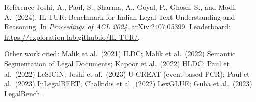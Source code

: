 \documentclass[aspectratio=169,11pt]{beamer}
\begin{document}
\begin{frame}{Reference}
  \small
  Joshi, A., Paul, S., Sharma, A., Goyal, P., Ghosh, S., and Modi, A.\ (2024). IL-TUR: Benchmark for Indian Legal Text Understanding and Reasoning. In \emph{Proceedings of ACL 2024}. arXiv:2407.05399. Leaderboard: \url{https://exploration-lab.github.io/IL-TUR/}.
  \vspace{3mm}

  {\footnotesize Other work cited: Malik et al.\ (2021) ILDC; Malik et al.\ (2022) Semantic Segmentation of Legal Documents; Kapoor et al.\ (2022) HLDC; Paul et al.\ (2022) LeSICiN; Joshi et al.\ (2023) U-CREAT (event-based PCR); Paul et al.\ (2023) InLegalBERT; Chalkidis et al.\ (2022) LexGLUE; Guha et al.\ (2023) LegalBench.}
\end{frame}
\end{document}
